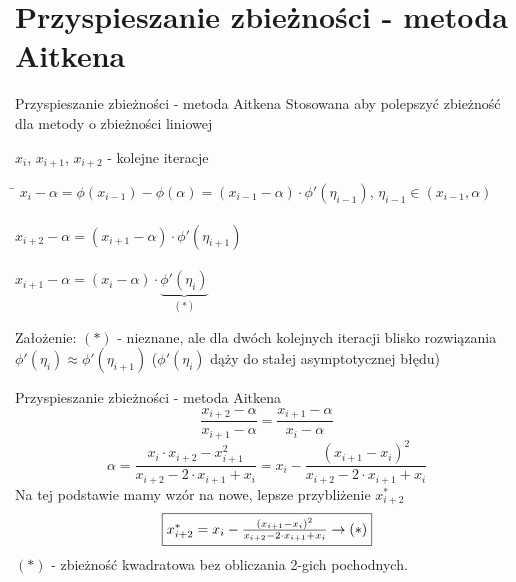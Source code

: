 \section{Przyspieszanie zbieżności - metoda Aitkena}
\begin{frame}{Przyspieszanie zbieżności - metoda Aitkena}
Stosowana aby
polepszyć zbieżność dla metody o zbieżności liniowej
    
    

 
	$x_{i}$, $x_{i+1}$, $x_{i+2}$ - kolejne iteracje\linebreak
	\begin{tabbing}
		\quad \= $x_{i} - \alpha = \phi(x_{i-1}) - \phi(\alpha) = (x_{i-1} - \alpha) \cdot \phi'(\eta_{i-1})$, \quad $\eta_{i-1} \in (x_{i-1}, \alpha)$\\\\
		\> $x_{i+2} - \alpha = (x_{i+1} - \alpha) \cdot \phi'(\eta_{i+1})$\\\\
		\> $x_{i+1} - \alpha = (x_{i} - \alpha) \cdot \underbrace{\phi'(\eta_{i})}_{(*)}$
	\end{tabbing}
	Założenie:	$(*)$ - nieznane, ale dla dwóch kolejnych iteracji blisko rozwiązania $\phi'(\eta_{i}) \approx \phi'(\eta_{i+1})$  ($\phi'(\eta_{i})$  dąży do stałej asymptotycznej błędu)

\end{frame}
\begin{frame}{Przyspieszanie zbieżności - metoda Aitkena}
	\[
		\frac{x_{i+2} - \alpha}{x_{i+1} - \alpha} = \frac{x_{i+1} - \alpha}{x_{i} - \alpha}
	\]
	\[
		\alpha = \frac{x_{i} \cdot x_{i+2} - x_{i+1}^{2}}{x_{i+2} - 2 \cdot x_{i+1} + x_{i}} =x_{i} - \frac{(x_{i+1} - x_{i})^{2}}{x_{i+2} - 2 \cdot x_{i+1} + x_{i}}
	\]
	Na tej podstawie mamy wzór na nowe, lepsze przybliżenie $x_{i+2}^{*}$
	\[
		\fbox{$x_{i+2}^{*} = x_{i} - \frac{(x_{i+1} - x_{i})^{2}}{x_{i+2} - 2 \cdot x_{i+1} + x_{i}} \rightarrow (*)$}
	\]
	$(*)$ - zbieżność kwadratowa bez obliczania 2-gich pochodnych\linebreak\linebreak. 

\end{frame}